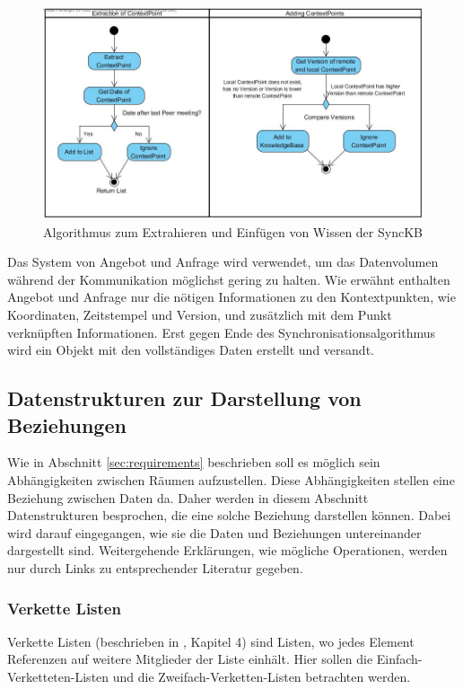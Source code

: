 \documentclass[a4paper]{article}
\begin{document}
	\begin{figure}[H] 
		\includegraphics[width=\linewidth]{../Bilder/sync_flow.jpg}
		\caption{Algorithmus zum Extrahieren und Einfügen von Wissen der SyncKB}
		\label{fig:SyncFlow}
	\end{figure}
	
	Das System von Angebot und Anfrage wird verwendet, um das Datenvolumen während
	der Kommunikation möglichst gering zu halten. Wie erwähnt enthalten Angebot
	und Anfrage nur die nötigen Informationen zu den Kontextpunkten, wie
	Koordinaten, Zeitstempel und Version, und zusätzlich mit dem Punkt verknüpften
	Informationen. Erst gegen Ende des Synchronisationsalgorithmus wird ein 
	Objekt mit den vollständiges Daten erstellt und versandt.
	
	\subsection{Datenstrukturen zur Darstellung von Beziehungen}
	
	Wie in Abschnitt \ref{sec:requirements} beschrieben soll es möglich sein
	Abhängigkeiten zwischen Räumen aufzustellen. Diese Abhängigkeiten stellen
	eine Beziehung zwischen Daten da. Daher werden in diesem Abschnitt 
	Datenstrukturen besprochen, die eine solche Beziehung darstellen können.
	Dabei wird darauf eingegangen, wie sie die Daten und Beziehungen untereinander
	dargestellt sind. Weitergehende Erklärungen, wie mögliche Operationen, werden
	nur durch Links zu entsprechender Literatur gegeben.
	
	\subsubsection{Verkette Listen}
	
	Verkette Listen (beschrieben in \cite{FundData}, Kapitel 4) sind Listen,
	wo jedes Element Referenzen auf weitere Mitglieder der Liste einhält.
	Hier sollen die Einfach-Verketteten-Listen und die Zweifach-Verketten-Listen
	betrachten werden.
	
\end{document}
